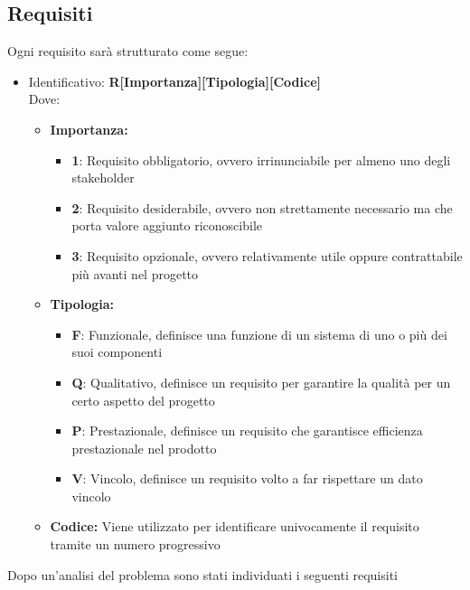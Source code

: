 \subsection{Requisiti}
Ogni requisito sarà strutturato come segue:
\begin{itemize}
	\item Identificativo: \textbf{R[Importanza][Tipologia][Codice]}\\
	Dove:
	\begin{itemize}
		\item \textbf{Importanza:}
		\begin{itemize}
			\item \textbf{1}: Requisito obbligatorio, ovvero irrinunciabile per almeno uno degli stakeholder
			\item \textbf{2}: Requisito desiderabile, ovvero non strettamente necessario ma che porta valore aggiunto riconoscibile
			\item \textbf{3}: Requisito opzionale, ovvero relativamente utile oppure contrattabile più avanti nel progetto
		\end{itemize}
		\item \textbf{Tipologia:}
		\begin{itemize}
			\item \textbf{F}: Funzionale, definisce una funzione di un sistema di uno o più dei suoi componenti
			\item \textbf{Q}: Qualitativo, definisce un requisito per garantire la qualità per un certo aspetto del progetto
			\item \textbf{P}: Prestazionale, definisce un requisito che garantisce efficienza prestazionale nel prodotto
			\item \textbf{V}: Vincolo, definisce un requisito volto a far rispettare un dato vincolo
		\end{itemize}
		\item \textbf{Codice:} Viene utilizzato per identificare univocamente il requisito tramite un numero progressivo\\
	\end{itemize}
\end{itemize}
Dopo un’analisi del problema sono stati individuati i seguenti requisiti
